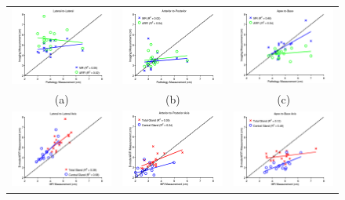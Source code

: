 \begin{figure}[htb!]
\centering
\begin{tabular}{ccc}
\includegraphics[width=0.3\linewidth]{figs/Lateral-to-Lateral} &
\includegraphics[width=0.3\linewidth]{figs/Anterior-to-Posterior} &
\includegraphics[width=0.3\linewidth]{figs/Apex-to-Base} \\
(a) & (b) & (c) \\
\includegraphics[width=0.3\linewidth]{figs/Imaging_Lateral-to-Lateral} &
\includegraphics[width=0.3\linewidth]{figs/Imaging_Anterior-to-Posterior} &
\includegraphics[width=0.3\linewidth]{figs/Imaging_Apex-to-Base} \\

\end{tabular}
\end{figure}

